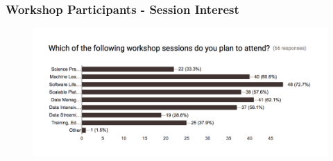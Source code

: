 \begin{frame}
\frametitle{Workshop Participants - Session Interest}

\begin{figure}[htbp]
\begin{center}
\includegraphics[width=1.0\textwidth]{images/s2i2-hep-cs-princeton-1-session-interest.png}
\end{center}
\end{figure}

\end{frame}


